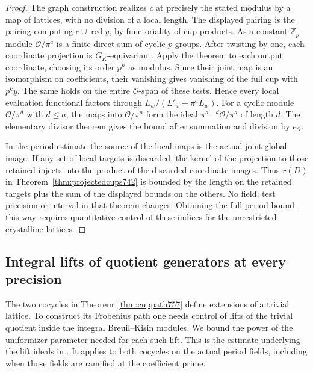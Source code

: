 \documentclass[a4paper,11pt]{article}
\theoremstyle{definition}
\theoremstyle{remark}
\newcommand{\ZZ}{\mathbb Z}\newcommand{\ord}{\operatorname{ord}}
\numberwithin{equation}{section}
\begin{document}
\begin{proof}
The graph construction realizes \(c\) at precisely the stated
modulus by a map of lattices, with no division of a local
length. The displayed pairing is the pairing computing
\(c\cup\operatorname{red} y\), by functoriality of cup products.
As a constant \(\ZZ_p\)-module \(\mathcal O/\pi^a\) is a finite
direct sum of cyclic \(p\)-groups. After twisting by one, each
coordinate projection is \(G_K\)-equivariant. Apply the theorem
to each output coordinate, choosing its order \(p^n\) as
modulus. Since their joint map is an isomorphism on coefficients,
their vanishing gives vanishing of the full cup with \(p^k y\).
The same holds on the entire \(\mathcal O\)-span of these tests.
Hence every local evaluation functional factors through
\(L_w/(L'_w+\pi^aL_w)\). For a cyclic module
\(\mathcal O/\pi^d\) with \(d\le a\), the maps into
\(\mathcal O/\pi^a\) form the ideal
\(\pi^{a-d}\mathcal O/\pi^a\) of length \(d\).
The elementary divisor theorem gives the bound after summation
and division by \(e_{\mathcal O}\).

In the period estimate the source of the local maps is the
actual joint global image. If any set of local targets is
discarded, the kernel of the projection to those retained
injects into the product of the discarded coordinate images.
Thus \(r(D)\) in Theorem~\ref{thm:projectedcups742} is bounded
by the length on the retained targets plus the sum of the
displayed bounds on the others. No field, test precision or
interval in that theorem changes. Obtaining the full period
bound this way requires quantitative control of these indices
for the unrestricted crystalline lattices.
\end{proof}
\clearpage

\subsection{Integral lifts of quotient generators at every precision}
\label{sec:kisinquotient759}
The two cocycles in Theorem~\ref{thm:cuppath757} define
extensions of a trivial lattice. To construct its Frobenius
path one needs control of lifts of the trivial quotient inside
the integral Breuil--Kisin modules. We bound the power of
the uniformizer parameter needed for each such lift. This is
the estimate underlying the lift ideals in
. It applies
to both cocycles on the actual period fields, including when
those fields are ramified at the coefficient prime.
\end{document}
